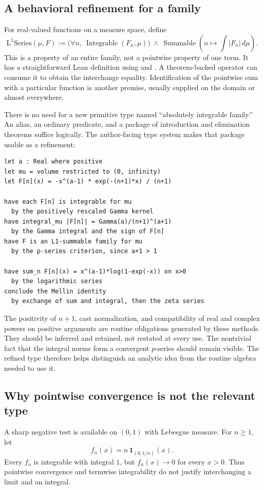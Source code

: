 \documentclass[11pt,a4paper]{article}
\newcommand{\code}[1]{\texttt{\detokenize{#1}}}
\newcommand{\Lone}{\operatorname{L^1Series}}
\theoremstyle{plain}\newtheorem{proposition}{Proposition}[section]
\theoremstyle{definition}\newtheorem{definition}[proposition]{Definition}
\theoremstyle{remark}\newtheorem{remark}[proposition]{Remark}
\begin{document}
\subsection{A behavioral refinement for a family}
For real-valued functions on a measure space, define
\[
 \Lone(\mu,F):=
 \bigl(\forall n,\ \operatorname{Integrable}(F_n,\mu)\bigr)
 \ \land\
 \operatorname{Summable}\!\left(n\mapsto\int |F_n|\,d\mu\right).
\]
This is a property of an entire family, not a pointwise property of one term. It has a straightforward Lean definition using \code{Integrable} and \code{Summable}. A theorem-backed operator can consume it to obtain the interchange equality. Identification of the pointwise sum with a particular function is another premise, usually supplied on the domain or almost everywhere.

There is no need for a new primitive type named ``absolutely integrable family.'' An alias, an ordinary predicate, and a package of introduction and elimination theorems suffice logically. The author-facing type system makes that package usable as a refinement:
\Needspace{18\baselineskip}
\begin{lstlisting}
let a : Real where positive
let mu = volume restricted to (0, infinity)
let F[n](x) = -x^(a-1) * exp(-(n+1)*x) / (n+1)

have each F[n] is integrable for mu
  by the positively rescaled Gamma kernel
have integral_mu |F[n]| = Gamma(a)/(n+1)^(a+1)
  by the Gamma integral and the sign of F[n]
have F is an L1-summable family for mu
  by the p-series criterion, since a+1 > 1

have sum_n F[n](x) = x^(a-1)*log(1-exp(-x)) on x>0
  by the logarithmic series
conclude the Mellin identity
  by exchange of sum and integral, then the zeta series
\end{lstlisting}

The positivity of \(n+1\), cast normalization, and compatibility of real and complex powers on positive arguments are routine obligations generated by these methods. They should be inferred and retained, not restated at every use. The nontrivial fact that the integral norms form a convergent \(p\)-series should remain visible. The refined type therefore helps distinguish an analytic idea from the routine algebra needed to use it.

\subsection{Why pointwise convergence is not the relevant type}
A sharp negative test is available on \((0,1)\) with Lebesgue measure. For \(n\ge1\), let
\[
 f_n(x)=n\,\mathbf1_{(0,1/n)}(x).
\]
Every \(f_n\) is integrable with integral \(1\), but \(f_n(x)\to0\) for every \(x>0\). Thus pointwise convergence and termwise integrability do not justify interchanging a limit and an integral.
\end{document}
